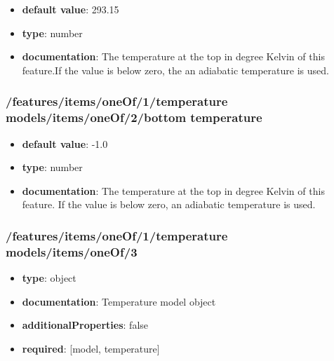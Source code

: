 \begin{itemize}\item {\bf default value}: 293.15
\item {\bf type}: number
\item {\bf documentation}: The temperature at the top in degree Kelvin of this feature.If the value is below zero, the an adiabatic temperature is used.
\end{itemize}\subsubsection{/features/items/oneOf/1/temperature models/items/oneOf/2/bottom temperature}
\begin{itemize}\item {\bf default value}: -1.0
\item {\bf type}: number
\item {\bf documentation}: The temperature at the top in degree Kelvin of this feature. If the value is below zero, an adiabatic temperature is used.
\end{itemize}\subsubsection{/features/items/oneOf/1/temperature models/items/oneOf/3}
\begin{itemize}\item {\bf type}: object
\item {\bf documentation}: Temperature model object
\item {\bf additionalProperties}: false
\item {\bf required}: [model, temperature]\end{itemize}
